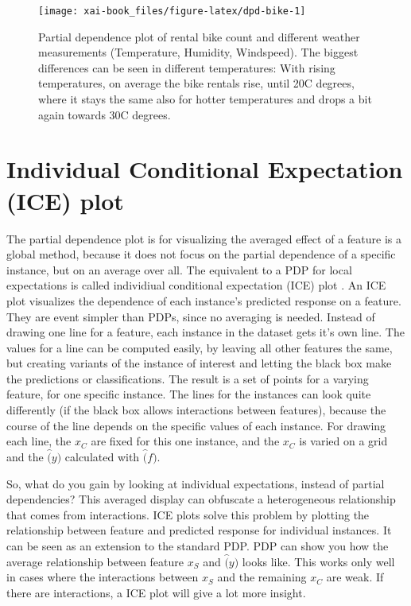 \documentclass[12pt,]{krantz}
\theoremstyle{definition}
\theoremstyle{definition}
\theoremstyle{definition}
\theoremstyle{remark}
\begin{document}
\begin{figure}

{\centering \texttt{[image: xai-book\_files/figure-latex/dpd-bike-1]} 

}

\caption{Partial dependence plot of rental bike count and different weather measurements (Temperature, Humidity, Windspeed). The biggest differences can be seen in different temperatures: With rising temperatures, on average the bike rentals rise, until 20C degrees, where it stays the same also for hotter temperatures and drops a bit again towards 30C degrees.}\label{fig:dpd-bike}
\end{figure}

\section{Individual Conditional Expectation (ICE)
plot}\label{individual-conditional-expectation-ice-plot}

The partial dependence plot is for visualizing the averaged effect of a
feature is a global method, because it does not focus on the partial
dependence of a specific instance, but on an average over all. The
equivalent to a PDP for local expectations is called individiual
conditional expectation (ICE) plot \citep{goldstein2015peeking}. An ICE
plot visualizes the dependence of each instance's predicted response on
a feature. They are event simpler than PDPs, since no averaging is
needed. Instead of drawing one line for a feature, each instance in the
dataset gets it's own line. The values for a line can be computed
easily, by leaving all other features the same, but creating variants of
the instance of interest and letting the black box make the predictions
or classifications. The result is a set of points for a varying feature,
for one specific instance. The lines for the instances can look quite
differently (if the black box allows interactions between features),
because the course of the line depends on the specific values of each
instance. For drawing each line, the \(x_C\) are fixed for this one
instance, and the \(x_C\) is varied on a grid and the \(\hat(y)\)
calculated with \(\hat(f)\).

So, what do you gain by looking at individual expectations, instead of
partial dependencies? This averaged display can obfuscate a
heterogeneous relationship that comes from interactions. ICE plots
\citet{goldstein2015peeking} solve this problem by plotting the
relationship between feature and predicted response for individual
instances. It can be seen as an extension to the standard PDP. PDP can
show you how the average relationship between feature \(x_S\) and
\(\hat(y)\) looks like. This works only well in cases where the
interactions between \(x_S\) and the remaining \(x_C\) are weak. If
there are interactions, a ICE plot will give a lot more insight.
\end{document}

